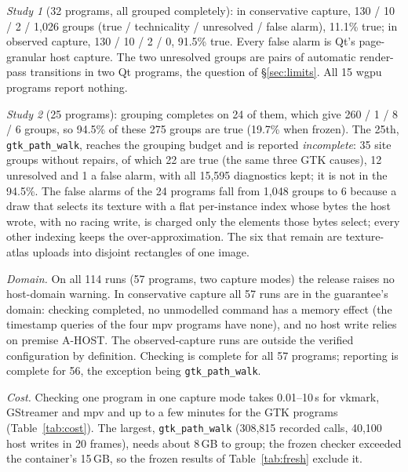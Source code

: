 \documentclass[acmtog,anonymous,review]{acmart}
\newcommand{\code}[1]{\texttt{#1}}
\begin{document}
\emph{Study 1} (32 programs, all grouped completely): in conservative capture, 130 / 10 / 2 / 1,026 groups (true /
technicality / unresolved / false alarm), 11.1\% true; in observed capture, 130 / 10 / 2 / 0, 91.5\% true. Every
false alarm is Qt's page-granular host capture. The two unresolved groups are pairs of automatic render-pass
transitions in two Qt programs, the question of \S\ref{sec:limits}. All 15 wgpu programs report nothing.

\emph{Study 2} (25 programs): grouping completes on 24 of them, which give 260 / 1 / 8 / 6 groups, so 94.5\% of these
275 groups are true (19.7\% when frozen). The 25th, \code{gtk\_path\_walk}, reaches the grouping budget and is reported
\emph{incomplete}: 35 site groups without repairs, of which 22 are true (the same three GTK causes), 12 unresolved and
1 a false alarm, with all 15,595 diagnostics kept; it is not in the 94.5\%. The false alarms of the 24 programs fall
from 1,048 groups to 6 because a draw that selects its texture with a flat per-instance index whose bytes the host
wrote, with no racing write, is charged only the elements those bytes select; every other indexing keeps the
over-approximation. The six that remain are texture-atlas uploads into disjoint rectangles of one image.

\emph{Domain.} On all 114 runs (57 programs, two capture modes) the release raises no host-domain warning. In
conservative capture all 57 runs are in the
guarantee's domain: checking completed, no unmodelled command has a memory effect (the timestamp queries of the four
mpv programs have none), and no host write relies on premise A-HOST. The observed-capture runs are outside the
verified configuration by definition. Checking is complete for all 57 programs; reporting is complete for 56, the
exception being \code{gtk\_path\_walk}.

\emph{Cost.} Checking one program in one capture mode takes 0.01--10\,s for vkmark, GStreamer and mpv and up to a
few minutes for the GTK programs (Table~\ref{tab:cost}). The largest, \code{gtk\_path\_walk} (308,815 recorded calls,
40,100 host writes in 20 frames), needs about 8\,GB to group; the frozen checker exceeded the container's 15\,GB, so
the frozen results of Table~\ref{tab:fresh} exclude it.
\end{document}
